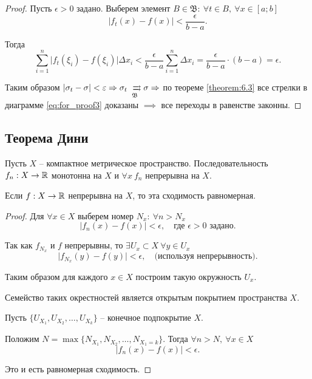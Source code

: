 \begin{proof}
    Пусть $ \epsilon > 0 $ задано. Выберем элемент $ B \in \mathfrak{B}: \ \forall t \in B, \ \forall x \in [a;b] $
    \[
        \big|f_t(x) - f(x)\big| < \frac{\epsilon}{b - a}.
    \]

    Тогда
    \[
        \sum_{i=1}^{n}\big|f_t(\xi_i) - f(\xi_i)\big|\Delta x_i < \frac{\epsilon}{b - a}\sum_{i=1}^{n}\Delta x_i = \frac{\epsilon}{b-a}\cdot(b-a) = \epsilon.
    \]

    Таким образом $ | \sigma_t - \sigma | < \epsilon \implies \sigma_t \xrightrightarrows[\mathfrak{B}]{} \sigma \implies $ по теореме \ref{theorem:6.3} все стрелки в диаграмме \ref{eq:for_proof3} доказаны $ \implies $ все переходы в равенстве законны.
\end{proof}

\subsection{Теорема Дини}

\begin{theorem}[Дини]
    Пусть $ X $ -- компактное метрическое пространство. Последовательность $ f_n: X \rightarrow\mathbb{R} $ монотонна на $ X $ и $ \forall x \ f_n $ непрерывна на $ X $.

    Если $ f: X \rightarrow \mathbb{R} $ непрерывна на $ X $, то эта сходимость равномерная.
\end{theorem}

\begin{proof}
    Для $ \forall x \in X $ выберем номер $ N_x: \ \forall n > N_x $
    \[
        \big|f_n(x) - f(x)\big| < \epsilon, \quad \text{где }\epsilon>0 \text{ задано}.
    \]

    Так как $ f_{N_x} $ и $ f $ непрерывны, то $ \exists U_x \subset X \ \forall y \in U_x $
    \[
        \big|f_{N_x}(y) - f(y)\big| < \epsilon, \quad \text{(используя непрерывность)}.
    \]

    Таким образом для каждого $ x \in X $ построим такую окружность $ U_x $.

    Семейство таких окрестностей является открытым покрытием пространства $ X $.

    Пусть $ \{U_{X_1},U_{X_2},\ldots,U_{X_k}\} $ -- конечное подпокрытие $ X $.

    Положим $ N = \max\{N_{X_1},N_{X_2},\ldots,N_{X_1=k}\} $. Тогда $ \forall n > N, \ \forall x \in X $
    \[
        \big|f_n(x) - f(x)\big| < \epsilon.
    \]

    Это и есть равномерная сходимость.
\end{proof}

